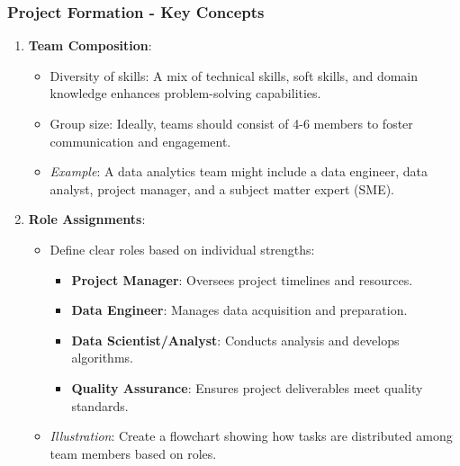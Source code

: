 \documentclass[aspectratio=169]{beamer}
\begin{document}
\begin{frame}[fragile]
    \frametitle{Project Formation - Key Concepts}
    \begin{enumerate}
        \item \textbf{Team Composition}:
        \begin{itemize}
            \item Diversity of skills: A mix of technical skills, soft skills, and domain knowledge enhances problem-solving capabilities.
            \item Group size: Ideally, teams should consist of 4-6 members to foster communication and engagement.
            \item \textit{Example}: A data analytics team might include a data engineer, data analyst, project manager, and a subject matter expert (SME).
        \end{itemize}

        \item \textbf{Role Assignments}:
        \begin{itemize}
            \item Define clear roles based on individual strengths:
            \begin{itemize}
                \item \textbf{Project Manager}: Oversees project timelines and resources.
                \item \textbf{Data Engineer}: Manages data acquisition and preparation.
                \item \textbf{Data Scientist/Analyst}: Conducts analysis and develops algorithms.
                \item \textbf{Quality Assurance}: Ensures project deliverables meet quality standards.
            \end{itemize}
            \item \textit{Illustration}: Create a flowchart showing how tasks are distributed among team members based on roles.
        \end{itemize}
    \end{enumerate}
\end{frame}
\end{document}
